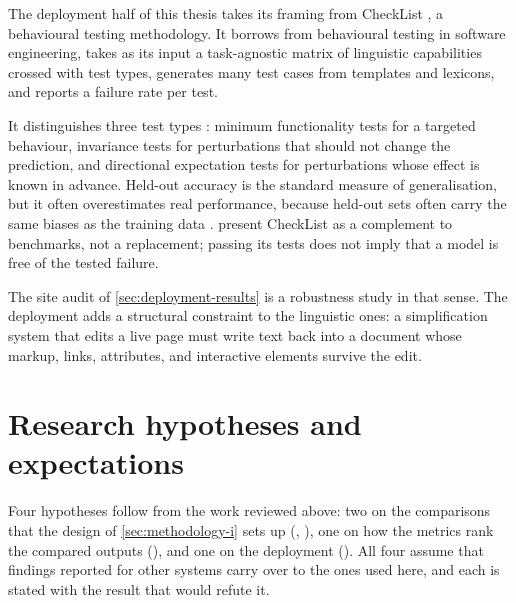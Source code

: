 The deployment half of this thesis takes its framing from CheckList \parencite[4902]{ribeiro-etal-2020-beyond}, a behavioural testing methodology.
It borrows from behavioural testing in software engineering, takes as its input a task-agnostic matrix of linguistic capabilities crossed with test types, generates many test cases from templates and lexicons, and reports a failure rate per test.

It distinguishes three test types \parencite[4902--4903]{ribeiro-etal-2020-beyond}: minimum functionality tests for a targeted behaviour, invariance tests for perturbations that should not change the prediction, and directional expectation tests for perturbations whose effect is known in advance.
Held-out accuracy is the standard measure of generalisation, but it often overestimates real performance, because held-out sets often carry the same biases as the training data \parencite[4902]{ribeiro-etal-2020-beyond}.
\textcite[4906, 4910]{ribeiro-etal-2020-beyond} present CheckList as a complement to benchmarks, not a replacement; passing its tests does not imply that a model is free of the tested failure.

The site audit of \cref{sec:deployment-results} is a robustness study in that sense.
The deployment adds a structural constraint to the linguistic ones: a simplification system that edits a live page must write text back into a document whose markup, links, attributes, and interactive elements survive the edit.

\section{Research hypotheses and expectations}
\label{sec:hypotheses}

Four hypotheses follow from the work reviewed above: two on the comparisons that the design of \cref{sec:methodology-i} sets up (, ), one on how the metrics rank the compared outputs (), and one on the deployment ().
All four assume that findings reported for other systems carry over to the ones used here, and each is stated with the result that would refute it.

